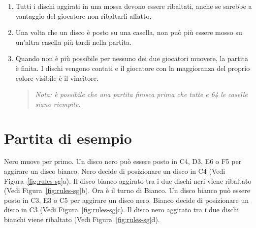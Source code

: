 \begin{enumerate}
    \begin{figure}[htbp]
      \centering
      \begin{subfigure}[b]{0.45\textwidth}
        \centering
        \caption{Disco posto qui}
      \end{subfigure}
      \hfill
      \begin{subfigure}[b]{0.45\textwidth}
        \centering
        \caption{Questi 2 dischi ribaltati. I dischi 1 e 2 non vengono ribaltati (anche se sembrano aggirati).}
      \end{subfigure}
      \caption{Vengono ribaltati solo i dischi nella linea diretta della mossa.}
      \label{fig:rules-r5}
    \end{figure}

  \item Tutti i dischi aggirati in una mossa devono essere ribaltati,
    anche se sarebbe a vantaggio del giocatore non ribaltarli affatto.

  \item Una volta che un disco è posto su una casella, non può più essere
    mosso su un'altra casella più tardi nella partita.

  \item Quando non è più possibile per nessuno dei due giocatori muovere, la
    partita è finita. I dischi vengono contati e il giocatore con la
    maggioranza del proprio colore visibile è il vincitore.

    \begin{quote}\itshape
      Nota: è possibile che una partita finisca prima che tutte e 64 le
      caselle siano riempite.
    \end{quote}
\end{enumerate}

\section{Partita di esempio}

Nero muove per primo. Un disco nero può essere posto in C4, D3, E6 o F5 per
aggirare un disco bianco. Nero decide di posizionare un disco in C4
(Vedi Figura~\ref{fig:rules-sg}a). Il disco bianco aggirato tra i due
dischi neri viene ribaltato (Vedi Figura~\ref{fig:rules-sg}b). Ora è il turno
di Bianco. Un disco bianco può essere posto in C3, E3 o C5 per aggirare
un disco nero. Bianco decide di posizionare un disco in C3 (Vedi
Figura~\ref{fig:rules-sg}c). Il disco nero aggirato tra i due dischi
bianchi viene ribaltato (Vedi Figura~\ref{fig:rules-sg}d).

